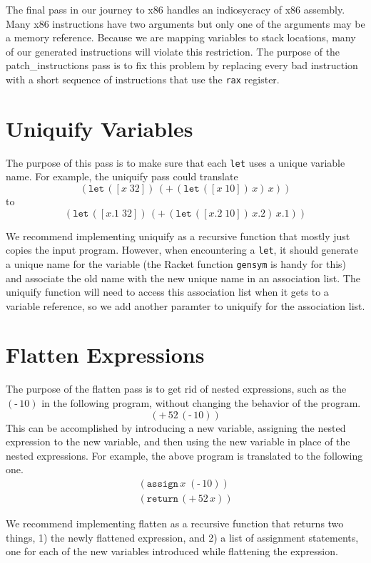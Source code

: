 \documentclass[12pt]{book}
\newcommand{\itm}[1]{\ensuremath{\mathit{#1}}}
\newcommand{\key}[1]{\texttt{#1}}
\newcommand{\UNIOP}[2]{(\key{#1}\,#2)}
\newcommand{\BINOP}[3]{(\key{#1}\,#2\,#3)}
\newcommand{\LET}[3]{(\key{let}\,([#1\;#2])\,#3)}
\newcommand{\ASSIGN}[2]{(\key{assign}\,#1\;#2)}
\newcommand{\RETURN}[1]{(\key{return}\,#1)}
\begin{document}
The final pass in our journey to x86 handles an indiosycracy of x86
assembly. Many x86 instructions have two arguments but only one of the
arguments may be a memory reference. Because we are mapping variables
to stack locations, many of our generated instructions will violate
this restriction. The purpose of the \textsf{patch\_instructions} pass
is to fix this problem by replacing every bad instruction with a short
sequence of instructions that use the \key{rax} register.

\section{Uniquify Variables}

The purpose of this pass is to make sure that each \key{let} uses a
unique variable name. For example, the \textsf{uniquify} pass could
translate
\[
\LET{x}{32}{ \BINOP{+}{ \LET{x}{10}{x} }{ x } }
\]
to
\[
\LET{x.1}{32}{ \BINOP{+}{ \LET{x.2}{10}{x.2} }{ x.1 } }
\]

We recommend implementing \textsf{uniquify} as a recursive function
that mostly just copies the input program. However, when encountering
a \key{let}, it should generate a unique name for the variable (the
Racket function \key{gensym} is handy for this) and associate the old
name with the new unique name in an association list. The
\textsf{uniquify} function will need to access this association list
when it gets to a variable reference, so we add another paramter to
\textsf{uniquify} for the association list.

\section{Flatten Expressions}

The purpose of the \textsf{flatten} pass is to get rid of nested
expressions, such as the $\UNIOP{-}{10}$ in the following program,
without changing the behavior of the program.
\[
\BINOP{+}{52}{ \UNIOP{-}{10} }
\]
This can be accomplished by introducing a new variable, assigning the
nested expression to the new variable, and then using the new variable
in place of the nested expressions. For example, the above program is
translated to the following one.
\[
\begin{array}{l}
\ASSIGN{ \itm{x} }{ \UNIOP{-}{10} } \\
\RETURN{ \BINOP{+}{52}{ \itm{x} } }
\end{array}
\]

We recommend implementing \textsf{flatten} as a recursive function
that returns two things, 1) the newly flattened expression, and 2) a
list of assignment statements, one for each of the new variables
introduced while flattening the expression.
\end{document}
